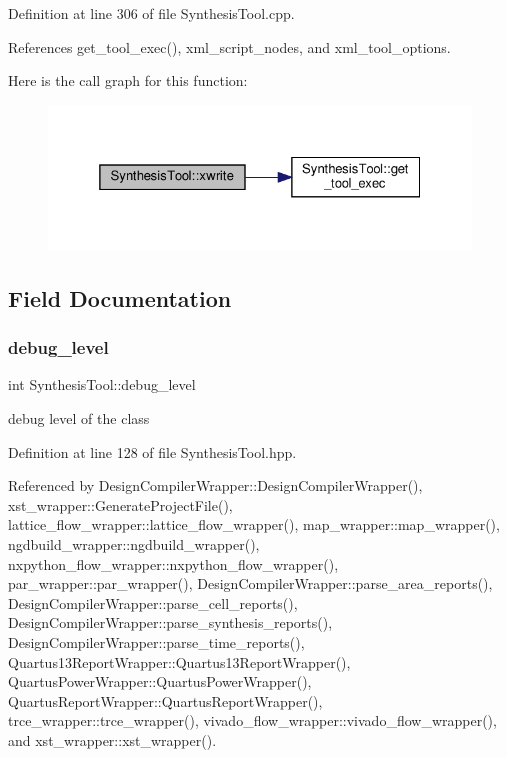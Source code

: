 Definition at line 306 of file Synthesis\+Tool.\+cpp.



References get\+\_\+tool\+\_\+exec(), xml\+\_\+script\+\_\+nodes, and xml\+\_\+tool\+\_\+options.

Here is the call graph for this function\+:
\nopagebreak
\begin{figure}[H]
\begin{center}
\leavevmode
\includegraphics[width=325pt]{d9/de0/classSynthesisTool_afd06f53f3a3273de98fe02143b123252_cgraph}
\end{center}
\end{figure}


\subsection{Field Documentation}
\mbox{\label{classSynthesisTool_a1b1a9cc667ea83558332386d5a0594a5}} 
\subsubsection{\texorpdfstring{debug\+\_\+level}{debug\_level}}
{\footnotesize\ttfamily int Synthesis\+Tool\+::debug\+\_\+level\hspace{0.3cm}{\ttfamily [protected]}}



debug level of the class 



Definition at line 128 of file Synthesis\+Tool.\+hpp.



Referenced by Design\+Compiler\+Wrapper\+::\+Design\+Compiler\+Wrapper(), xst\+\_\+wrapper\+::\+Generate\+Project\+File(), lattice\+\_\+flow\+\_\+wrapper\+::lattice\+\_\+flow\+\_\+wrapper(), map\+\_\+wrapper\+::map\+\_\+wrapper(), ngdbuild\+\_\+wrapper\+::ngdbuild\+\_\+wrapper(), nxpython\+\_\+flow\+\_\+wrapper\+::nxpython\+\_\+flow\+\_\+wrapper(), par\+\_\+wrapper\+::par\+\_\+wrapper(), Design\+Compiler\+Wrapper\+::parse\+\_\+area\+\_\+reports(), Design\+Compiler\+Wrapper\+::parse\+\_\+cell\+\_\+reports(), Design\+Compiler\+Wrapper\+::parse\+\_\+synthesis\+\_\+reports(), Design\+Compiler\+Wrapper\+::parse\+\_\+time\+\_\+reports(), Quartus13\+Report\+Wrapper\+::\+Quartus13\+Report\+Wrapper(), Quartus\+Power\+Wrapper\+::\+Quartus\+Power\+Wrapper(), Quartus\+Report\+Wrapper\+::\+Quartus\+Report\+Wrapper(), trce\+\_\+wrapper\+::trce\+\_\+wrapper(), vivado\+\_\+flow\+\_\+wrapper\+::vivado\+\_\+flow\+\_\+wrapper(), and xst\+\_\+wrapper\+::xst\+\_\+wrapper().

